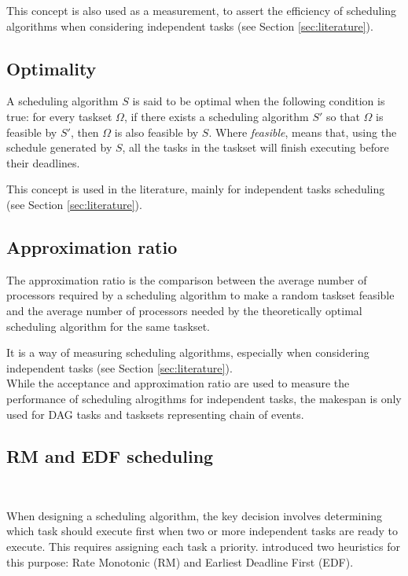 This concept is also used as a measurement, to assert the efficiency
of scheduling algorithms when considering independent tasks (see Section \ref{sec:literature}).

\subsection{Optimality}

A scheduling algorithm $S$ is said to be optimal 
when the following condition is true:
for every taskset $\Omega$, if there exists 
a scheduling algorithm $S'$ so that $\Omega$ is feasible by $S'$,
then $\Omega$ is also feasible by $S$.
Where {\it{feasible}}, 
means that, using the schedule generated by $S$,
all the tasks in the taskset will finish executing before their deadlines.

This concept is used in the literature, mainly for independent tasks scheduling
(see Section \ref{sec:literature}).

\subsection{Approximation ratio}

The approximation ratio is the comparison between 
the average number of processors required by a scheduling algorithm 
to make a random taskset feasible and the average number of 
processors needed by the theoretically optimal scheduling algorithm 
for the same taskset.

It is a way of measuring scheduling algorithms,
especially when considering independent tasks (see Section \ref{sec:literature}).
\\


While the acceptance and approximation ratio are used 
to measure the performance of scheduling alrogithms for independent tasks,
the makespan is only used for DAG tasks and tasksets representing chain of events.

\subsection{RM and EDF scheduling}
~

When designing a scheduling algorithm, the key decision involves 
determining which task should execute first when two or more 
independent tasks are ready to execute. This requires assigning each 
task a priority. \cite{liu1973scheduling} introduced two 
heuristics for this purpose: Rate Monotonic (RM) and Earliest 
Deadline First (EDF).


